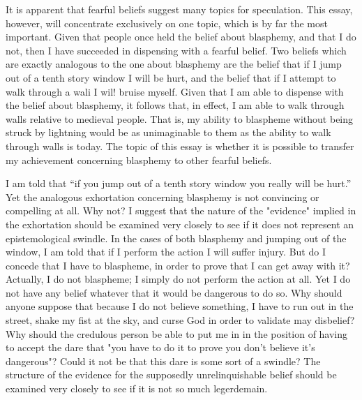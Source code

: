 \documentclass[10pt,twoside]{memoir}
\begin{document}
It is apparent that fearful beliefs suggest many topics for speculation. 
This essay, however, will concentrate exclusively on one topic, which is by 
far the most important. Given that people once held the belief about 
blasphemy, and that I do not, then I have succeeded in dispensing with a 
fearful belief. Two beliefs which are exactly analogous to the one about 
blasphemy are the belief that if I jump out of a tenth story window I will be 
hurt, and the belief that if I attempt to walk through a wali I wil! bruise 
myself. Given that I am able to dispense with the belief about blasphemy, it 
follows that, in effect, I am able to walk through walls relative to medieval 
people. That is, my ability to blaspheme without being struck by lightning 
would be as unimaginable to them as the ability to walk through walls is 
today. The topic of this essay is whether it is possible to transfer my 
achievement concerning blasphemy to other fearful beliefs. 

\visbreak

I am told that \enquote{if you jump out of a tenth story window you really will 
be hurt.} Yet the analogous exhortation concerning blasphemy is not 
convincing or compelling at all. Why not? I suggest that the nature of the 
"evidence" implied in the exhortation should be examined very closely to 
see if it does not represent an epistemological swindle. In the cases of both 
blasphemy and jumping out of the window, I am told that if I perform the 
action I will suffer injury. But do I concede that I have to blaspheme, in 
order to prove that I can get away with it? Actually, I do not blaspheme; I 
simply do not perform the action at all. Yet I do not have any belief 
whatever that it would be dangerous to do so. Why should anyone suppose 
that because I do not believe something, I have to run out in the street, 
shake my fist at the sky, and curse God in order to validate may disbelief? 
Why should the credulous person be able to put me in in the position of 
having to accept the dare that "you have to do it to prove you don't believe 
it's dangerous"? Could it not be that this dare is some sort of a swindle? 
The structure of the evidence for the supposedly unrelinquishable belief 
should be examined very closely to see if it is not so much legerdemain. 
\end{document}
